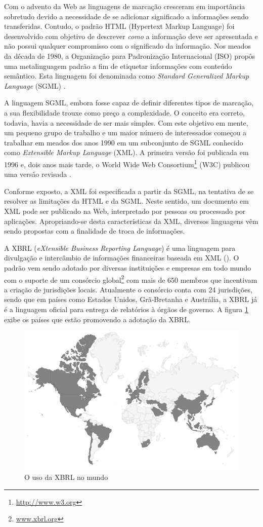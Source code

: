 \documentclass[msc,proposal,hidelot,hideabstract]{ppgccufmg} %
\begin{document}
Com o advento da Web as linguagens de marcação cresceram em importância sobretudo devido a necessidade de se adicionar significado a informações sendo transferidas. Contudo, o padrão HTML (Hypertext
Markup Language) foi desenvolvido com objetivo de descrever \textit{como} a informação deve ser apresentada e não possui qualquer compromisso com o significado da informação. Nos meados da década de 1980,  a Organização para Padronização Internacional (ISO) propôs uma metalinguagem padrão a fim de etiquetar informações com conteúdo semântico. Esta linguagem foi denominada como \textit{Standard Generalized Markup Language} (SGML) \cite{smith1988sgml}.

A linguagem SGML, embora fosse capaz de definir diferentes tipos de marcação, a sua flexibilidade trouxe como preço a complexidade. O conceito era correto, todavia, havia a necessidade de ser mais simples. Com este objetivo em mente, um pequeno grupo de trabalho e um maior número de interessados começou a trabalhar em
meados dos anos 1990 em um subconjunto de SGML conhecido como \textit{Extensible Markup Language} (XML). A primeira versão foi publicada em 1996 e, dois anos mais tarde, o World Wide Web Consortium\footnote{\url{http://www.w3.org}} (W3C) publicou uma versão revisada \cite{Fawcett:2012:BX:2408362}{}.

Conforme exposto, a XML foi especificada a partir da SGML, na tentativa de se resolver as limitações da HTML
e da SGML. Neste sentido, um documento em XML pode ser publicado na Web, interpretado por pessoas
ou processado por aplicações. Apropriando-se desta características da XML, diversos linguagens vêm sendo propostas com a finalidade de troca de informações.

A XBRL (\textit{eXtensible Business Reporting Language}) é uma linguagem para divulgação e intercâmbio de informações financeiras baseada em XML (\cite{xbrl_conceitos_aplicacoes}). O padrão vem sendo adotado por diversas instituições e empresas em todo mundo com o suporte de um consórcio global\footnote{\url{www.xbrl.org}} com mais de 650 membros que incentivam a criação de jurisdições locais. Atualmente o consórcio conta com 24 jurisdições, sendo que em países como  Estados Unidos, Grã-Bretanha e Austrália, a XBRL já é a linguagem oficial para entrega de relatórios à órgãos de governo. A figura \ref{fig:world_map} exibe os países que estão promovendo a adotação da XBRL.

\begin{figure}[hbtp]
\centering
\includegraphics[width=.75\textwidth]{img/world-map.png}
\caption{O uso da XBRL no mundo}
\label{fig:world_map}
\end{figure}
\end{document}
